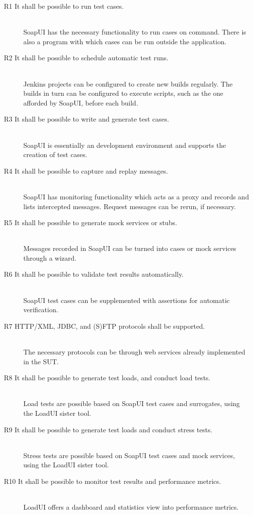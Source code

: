 \documentclass[12pt,a4paper,oneside,pdftex]{report}
\begin{document}
{\begin{description}
  \item[R1 It shall be possible to run test cases.] \hfill \\
 SoapUI has the necessary functionality to run cases on command. There is also a program with which cases can be run outside the application.
  \item[R2 It shall be possible to schedule automatic test runs.] \hfill \\
  Jenkins projects can be configured to create new builds regularly. The builds in turn can be configured to execute scripts, such as the one afforded by SoapUI, before each build.
  \item[R3 It shall be possible to write and generate test cases.] \hfill \\
  SoapUI is essentially an development environment and supports the creation of test cases.
  \item[R4 It shall be possible to capture and replay messages.] \hfill \\
  SoapUI has monitoring functionality which acts as a proxy and records and lists intercepted messages. Request messages can be rerun, if necessary.
  \item[R5 It shall be possible to generate mock services or stubs.] \hfill \\
  Messages recorded in SoapUI can be turned into cases or mock services through a wizard.
  \item[R6 It shall be possible to validate test results automatically.] \hfill \\
  SoapUI test cases can be supplemented with assertions for automatic verification.
  \item[R7 HTTP/XML, JDBC, and (S)FTP protocols shall be supported.]  \hfill \\
  The necessary protocols can be through web services already implemented in the SUT.
  \item[R8 It shall be possible to generate test loads, and conduct load tests.] \hfill \\
   Load tests are possible based on SoapUI test cases and surrogates, using the LoadUI sister tool.
  \item[R9 It shall be possible to generate test loads and conduct stress tests.] \hfill \\
   Stress tests are possible based on SoapUI test cases and mock services, using the LoadUI sister tool.
  \item[R10 It shall be possible to monitor test results and performance metrics.] \hfill \\
 LoadUI offers a dashboard and statistics view into performance metrics.
\end{description}

}
\end{document}
